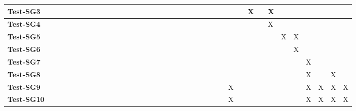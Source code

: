 \documentclass[12pt, titlepage]{article}
\begin{document}
\begin{landscape}
\begin{table}[H]
\begin{adjustwidth}{-0.1in}{-1in}
{\begin{tabular}{|c|c|c|c|c|c|c|c|c|c|c|c|c|c|c|c|c|l|l|l|l|l|l|l|l|l|l|l|l|l|l|l|l|l|l|l|l|}
\multicolumn{1}{|l|}{\textbf{Test-SG3}}   &             &             &             &              &              &             &             &             &              &              &              &              &             &             &              &                & & & & & & & & & & & & X& & X& & & & & &\\ \hline
\multicolumn{1}{|l|}{\textbf{Test-SG4}}   &             &             &             &              &             &             &             &             &              &              &             &              &              &              &              &                & & & & & & & & & & & & & & X& & & & & &\\ \hline
\multicolumn{1}{|l|}{\textbf{Test-SG5}}   &              &              &              &              &              &             &             &             &              &              &             &             &              &              &              &                & & & & & & & & & & & & & & & X& X& & & &\\ \hline
\multicolumn{1}{|l|}{\textbf{Test-SG6}}   &              &              &              &              &              &             &             &             &             &             &             &             &              &              &              &                & & & & & & & & & & & & & & & & X& & & &\\ \hline
\multicolumn{1}{|l|}{\textbf{Test-SG7}}   &             &             &             &              &             &             &             &             &              &              &              &             &             &             &              &                & & & & & & & & & & & & & & & & &X & & &\\ \hline
\multicolumn{1}{|l|}{\textbf{Test-SG8}}   &              &              &              &              &              &             &             &             &             &             &             &             &              &              &              &                & & & & & & & & & & & & & & & & &X & &X& \\ \hline
\multicolumn{1}{|l|}{\textbf{Test-SG9}}   &             &             &             &             &             &             &             &             &              &              &              &              &             &             &              &                & & & & & & & & & &X & & & & & & &X &X &X &X\\ \hline
\multicolumn{1}{|l|}{\textbf{Test-SG10}}   &             &             &             &              &             &             &             &             &              &              &             &             &             &             &              &                & & & & & & & & & &X & & & & & & &X &X &X &X\\ \hline



\end{tabular}}
\end{adjustwidth}
\end{table}
\end{landscape}
\end{document}
